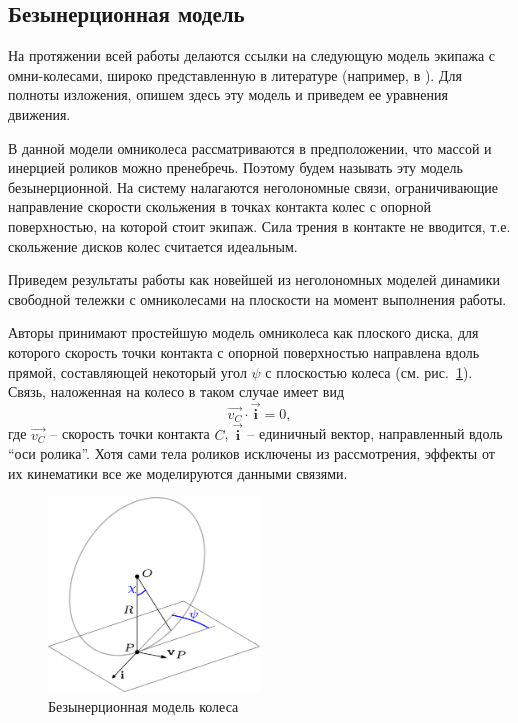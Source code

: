 \subsection{Безынерционная модель}

На протяжении всей работы делаются ссылки на следующую модель экипажа с омни-колесами, широко представленную в литературе (например, в \cite{Borisov2011, formalskii, ZobovaTatarinovPMM}). Для полноты изложения, опишем здесь эту модель и приведем ее уравнения движения.

В данной модели омниколеса рассматриваются в предположении, что массой и инерцией роликов можно пренебречь. Поэтому будем называть эту модель безынерционной. На систему налагаются неголономные связи, ограничивающие направление скорости скольжения в точках контакта колес с опорной поверхностью, на которой стоит экипаж. Сила трения в контакте не вводится, т.е. скольжение дисков колес считается идеальным.

Приведем результаты работы \cite{Borisov2011} как новейшей из неголономных моделей динамики свободной тележки с омниколесами на плоскости на момент выполнения работы.

Авторы \cite{Borisov2011} принимают простейшую модель омниколеса как плоского диска, для которого скорость точки контакта с опорной поверхностью направлена вдоль прямой, составляющей некоторый угол $\psi$ с плоскостью колеса (см. рис.~\ref{fig:bor_wheel_scheme}). Связь, наложенная на колесо в таком случае имеет вид
$$\vec{v_C}\cdot\vec{\mathbf{i}} = 0,$$
где $\vec{v_C}$ -- скорость точки контакта $C$, $\vec{\mathbf{i}}$ -- единичный вектор, направленный вдоль ``оси ролика''. Хотя сами тела роликов исключены из рассмотрения, эффекты от их кинематики все же моделируются данными связями.\\

\begin{figure}[ht!]
    \centering
    \includegraphics[width=0.5\textwidth]{content/pic/asy/wheel_bor.png}
    \caption{Безынерционная модель колеса}
    \label{fig:bor_wheel_scheme}
\end{figure}

